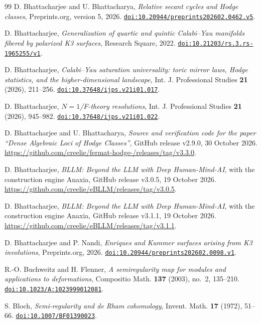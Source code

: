 \documentclass[11pt,reqno]{amsart}
\numberwithin{equation}{section}
\theoremstyle{plain}
\theoremstyle{definition}
\newcommand{\codeRelease}{https://github.com/creelie/fermat-hodge-/releases/tag/v3.3.0}
\begin{document}
\begin{thebibliography}{99}
D. Bhattacharjee and U. Bhattacharya,
\emph{Relative secant cycles and Hodge classes},
Preprints.org, version 5, 2026.
\href{https://doi.org/10.20944/preprints202602.0462.v5}{\nolinkurl{doi:10.20944/preprints202602.0462.v5}}.

D. Bhattacharjee,
\emph{Generalization of quartic and quintic Calabi--Yau manifolds fibered by polarized K3 surfaces},
Research Square, 2022.
\href{https://doi.org/10.21203/rs.3.rs-1965255/v1}{\nolinkurl{doi:10.21203/rs.3.rs-1965255/v1}}.

D. Bhattacharjee,
\emph{Calabi--Yau saturation universality: toric mirror laws, Hodge statistics, and the higher-dimensional landscape},
Int. J. Professional Studies \textbf{21} (2026), 211--256.
\href{https://doi.org/10.37648/ijps.v21i01.017}{\nolinkurl{doi:10.37648/ijps.v21i01.017}}.

D. Bhattacharjee,
\emph{$N=1$/F-theory resolutions},
Int. J. Professional Studies \textbf{21} (2026), 945--982.
\href{https://doi.org/10.37648/ijps.v21i01.022}{\nolinkurl{doi:10.37648/ijps.v21i01.022}}.

D. Bhattacharjee and U. Bhattacharya,
\emph{Source and verification code for the paper ``Dense Algebraic Loci of Hodge Classes''},
GitHub release v2.9.0, 30 October 2026.
\url{\codeRelease}.

D. Bhattacharjee,
\emph{BLLM: Beyond the LLM with Deep Human-Mind-AI}, with the construction engine Anaxia,
GitHub release v3.0.5, 19 October 2026.
\url{https://github.com/creelie/eBLLM/releases/tag/v3.0.5}.

D. Bhattacharjee,
\emph{BLLM: Beyond the LLM with Deep Human-Mind-AI}, with the construction engine Anaxia,
GitHub release v3.1.1, 19 October 2026.
\url{https://github.com/creelie/eBLLM/releases/tag/v3.1.1}.

D. Bhattacharjee and P. Nandi,
\emph{Enriques and Kummer surfaces arising from K3 involutions},
Preprints.org, 2026.
\href{https://doi.org/10.20944/preprints202602.0098.v1}{\nolinkurl{doi:10.20944/preprints202602.0098.v1}}.

R.-O. Buchweitz and H. Flenner,
\emph{A semiregularity map for modules and applications to deformations},
Compositio Math. \textbf{137} (2003), no.~2, 135--210.
\href{https://doi.org/10.1023/A:1023999012081}{\nolinkurl{doi:10.1023/A:1023999012081}}.

S. Bloch,
\emph{Semi-regularity and de Rham cohomology},
Invent. Math. \textbf{17} (1972), 51--66.
\href{https://doi.org/10.1007/BF01390023}{\nolinkurl{doi:10.1007/BF01390023}}.


\end{thebibliography}
\end{document}
